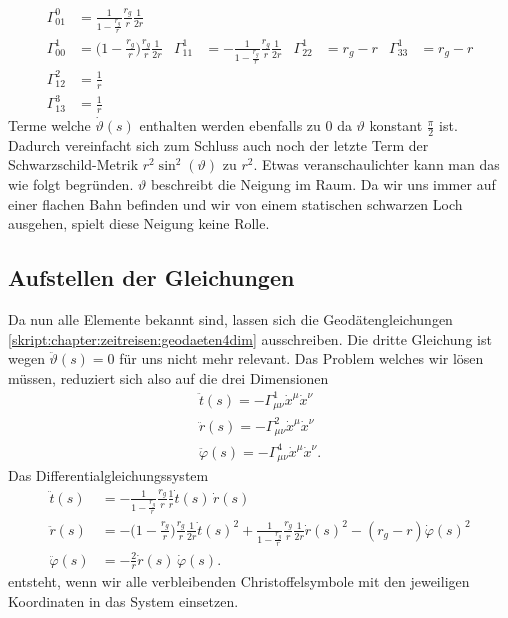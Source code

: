 \begin{refsection}
	\begin{align*}
	\Gamma^0_{01}
	&=
	\frac{1}{1-\displaystyle\frac{r_g}{r}}
	\frac{r_g}{r}
	\frac{1}{2r}
	\\
	\Gamma^1_{00}
	&=
	\biggl(1-\displaystyle\frac{r_g}{r}\biggr)
	\frac{r_g}{r}
	\frac{1}{2r}
	&
	\Gamma^1_{11}
	&=
	-\frac1{1-\displaystyle\frac{r_g}{r}}
	\frac{r_g}{r}
	\frac{1}{2r}
	&
	\Gamma^1_{22}
	&=
	r_g-r
	&
	\Gamma^1_{33}
	&=
	r_g-r
	\\
	\Gamma^2_{12}
	&=
	\frac1r
	\\
	\Gamma^3_{13}
	&=
	\frac1r
	\end{align*}
	Terme welche $\dot{\vartheta}(s)$ enthalten werden ebenfalls zu $0$ da $\vartheta$ konstant $\frac{\pi}{2}$ ist. Dadurch vereinfacht sich zum Schluss auch noch der letzte Term der Schwarzschild-Metrik $r^{2}\sin^{2}(\vartheta)$ zu $r^2$. Etwas veranschaulichter kann man das wie folgt begründen. $\vartheta$ beschreibt die Neigung im Raum. Da wir uns immer auf einer flachen Bahn befinden und wir von einem statischen schwarzen Loch ausgehen, spielt diese Neigung keine Rolle.
	
	
	\subsection{Aufstellen der Gleichungen}
	
	Da nun alle Elemente bekannt sind, lassen sich die Geodätengleichungen \ref{skript:chapter:zeitreisen:geodaeten4dim} ausschreiben. Die dritte Gleichung ist wegen $\ddot{\vartheta}(s)=0$ für uns nicht mehr relevant. Das Problem welches wir lösen müssen, reduziert sich also auf die drei Dimensionen
	\begin{align*}
	\ddot{t}(s) = -\Gamma^{1}_{\mu\nu}\dot{x}^{\mu}\dot{x}^{\nu}\\
	\ddot{r}(s) = -\Gamma^{2}_{\mu\nu}\dot{x}^{\mu}\dot{x}^{\nu}\\
	\ddot{\varphi}(s) = -\Gamma^{4}_{\mu\nu}\dot{x}^{\mu}\dot{x}^{\nu}.
	\end{align*} 
	Das Differentialgleichungssystem
	\begin{equation}\label{finaleq}
	\begin{aligned}
	\ddot t(s)
	&=
	-\frac{1}{1-\displaystyle\frac{r_g}{r}}\frac{r_g}{r}\frac{1}{r}\dot t(s)\,\dot r(s)
	\\
	\ddot r(s)
	&=
	-\biggl(1-\frac{r_g}{r}\biggr)\frac{r_g}{r}\frac1{2r}\dot t(s)^2
	+\frac{1}{1-\displaystyle\frac{r_g}{r}} \frac{r_g}{r}\frac1{2r}\dot r(s)^2
	- (r_g-r) \dot\varphi(s)^2
	\\
	\ddot \varphi(s)
	&=
	-\frac2r \dot r(s)\,\dot\varphi(s).
	\end{aligned}
	\end{equation}
	entsteht, wenn wir alle verbleibenden Christoffelsymbole mit den jeweiligen Koordinaten in das System einsetzen.
	

\end{refsection}
